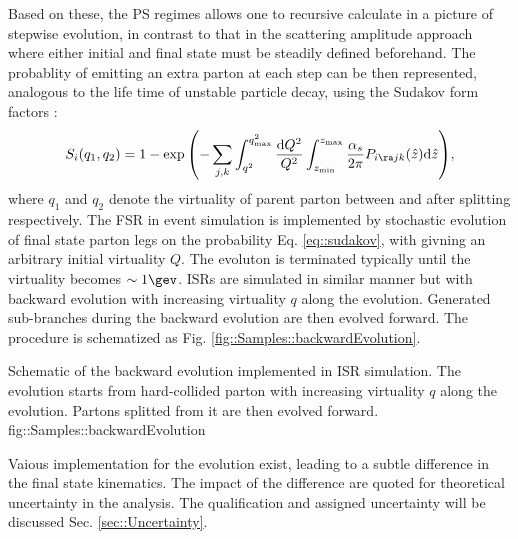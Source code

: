 Based on these, the PS regimes allows one to recursive calculate in a picture of stepwise evolution, in contrast to that in the scattering amplitude approach where either initial and final state must be steadily defined beforehand. The probablity of emitting an extra parton at each step can be then represented, analogous to the life time of unstable particle decay, using the Sudakov form factors \cite{Sudakov}:
\begin{align}
S_{i}(q_1, q_2) = 1 - \exp{ \left( -\sum_{j,k} \int_{q^2}^{q_{\mathrm{max}}^2} \frac{\mathrm{d}Q^2}{Q^2} \int_{z_{\min}}^{z_{\max}} \frac{\alpha_s}{2\pi} P_{i \ra j k}(\hat{z}) \mathrm{d}\hat{z}  \right)},
\label{eq::sudakov}
\end{align}
where $q_1$ and $q_2$ denote the virtuality of parent parton between and after splitting respectively.
The FSR in event simulation is implemented by stochastic evolution of final state parton legs on the probability Eq. \ref{eq::sudakov}, with givning an arbitrary initial virtuality $Q$. The evoluton is terminated typically until the virtuality becomes $\sim 1\gev$. ISRs are simulated in similar manner but with backward evolution with increasing virtuality $q$ along the evolution.
Generated sub-branches during the backward evolution are then evolved forward. The procedure is schematized as Fig. \ref{fig::Samples::backwardEvolution}.

{Schematic of the backward evolution implemented in ISR simulation. The evolution starts from hard-collided parton with increasing virtuality $q$ along the evolution. Partons splitted from it are then evolved forward.}
{fig::Samples::backwardEvolution}

Vaious implementation for the evolution exist, leading to a subtle difference in the final state kinematics.
The impact of the difference are quoted for theoretical uncertainty in the analysis. The qualification and assigned uncertainty will be discussed Sec. \ref{sec::Uncertainty}. \\


